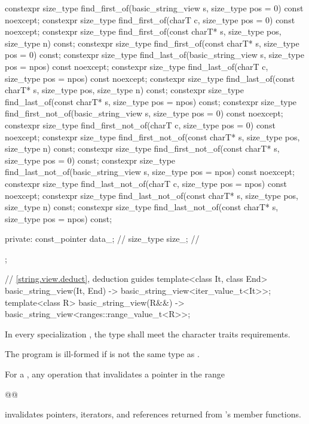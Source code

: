 \begin{codeblock}
{{    constexpr size_type find_first_of(basic_string_view s, size_type pos = 0) const noexcept;
    constexpr size_type find_first_of(charT c, size_type pos = 0) const noexcept;
    constexpr size_type find_first_of(const charT* s, size_type pos, size_type n) const;
    constexpr size_type find_first_of(const charT* s, size_type pos = 0) const;
    constexpr size_type find_last_of(basic_string_view s, size_type pos = npos) const noexcept;
    constexpr size_type find_last_of(charT c, size_type pos = npos) const noexcept;
    constexpr size_type find_last_of(const charT* s, size_type pos, size_type n) const;
    constexpr size_type find_last_of(const charT* s, size_type pos = npos) const;
    constexpr size_type find_first_not_of(basic_string_view s, size_type pos = 0) const noexcept;
    constexpr size_type find_first_not_of(charT c, size_type pos = 0) const noexcept;
    constexpr size_type find_first_not_of(const charT* s, size_type pos,
                                          size_type n) const;
    constexpr size_type find_first_not_of(const charT* s, size_type pos = 0) const;
    constexpr size_type find_last_not_of(basic_string_view s,
                                         size_type pos = npos) const noexcept;
    constexpr size_type find_last_not_of(charT c, size_type pos = npos) const noexcept;
    constexpr size_type find_last_not_of(const charT* s, size_type pos,
                                         size_type n) const;
    constexpr size_type find_last_not_of(const charT* s, size_type pos = npos) const;

  private:
    const_pointer data_;        // \expos
    size_type size_;            // \expos
  };

  // \ref{string.view.deduct}, deduction guides
  template<class It, class End>
    basic_string_view(It, End) -> basic_string_view<iter_value_t<It>>;
  template<class R>
    basic_string_view(R&&) -> basic_string_view<ranges::range_value_t<R>>;
}
\end{codeblock}

\pnum
In every specialization , the type  shall meet the character traits requirements.
\begin{note}
The program is ill-formed if  is not the same type as .
\end{note}

\pnum
For a ,
any operation that invalidates a pointer
in the range
\begin{codeblock}
@@
\end{codeblock}
invalidates pointers, iterators, and references
returned from 's member functions.

